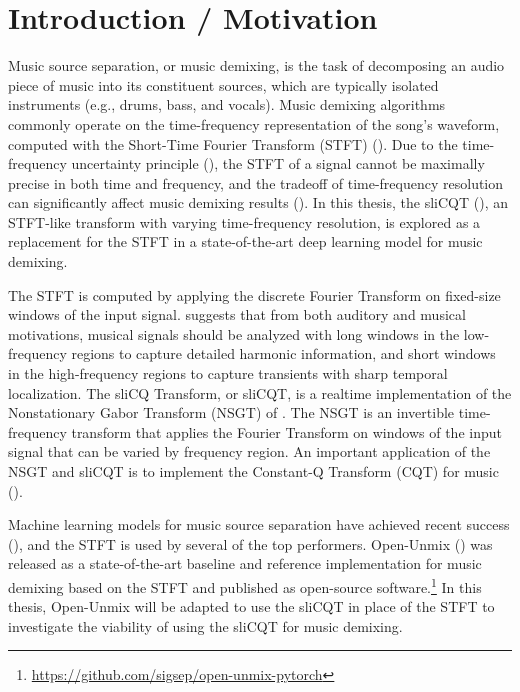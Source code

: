 \documentclass[letter,12pt]{article}
\title{\ThesisTitle}
\author{Sevag Hanssian}
\begin{document}
\maketitle

\section{Introduction / Motivation}

Music source separation, or music demixing, is the task of decomposing an audio piece of music into its constituent sources, which are typically isolated instruments (e.g., drums, bass, and vocals). Music demixing algorithms commonly operate on the time-frequency representation of the song's waveform, computed with the Short-Time Fourier Transform (STFT) (\cite{musicsepgood}). Due to the time-frequency uncertainty principle (\cite{gabor1946}), the STFT of a signal cannot be maximally precise in both time and frequency, and the tradeoff of time-frequency resolution can significantly affect music demixing results (\cite{tftradeoff1}). In this thesis, the sliCQT (\cite{slicq}), an STFT-like transform with varying time-frequency resolution, is explored as a replacement for the STFT in a state-of-the-art deep learning model for music demixing.

The STFT is computed by applying the discrete Fourier Transform on fixed-size windows of the input signal. \textcite{doerflerphd} suggests that from both auditory and musical motivations, musical signals should be analyzed with long windows in the low-frequency regions to capture detailed harmonic information, and short windows in the high-frequency regions to capture transients with sharp temporal localization. The sliCQ Transform, or sliCQT, is a realtime implementation of the Nonstationary Gabor Transform (NSGT) of \textcite{balazs}. The NSGT is an invertible time-frequency transform that applies the Fourier Transform on windows of the input signal that can be varied by frequency region. An important application of the NSGT and sliCQT is to implement the Constant-Q Transform (CQT) for music (\cite{jbrown}).

Machine learning models for music source separation have achieved recent success (\cite{sisec2018}), and the STFT is used by several of the top performers. Open-Unmix (\cite{umx}) was released as a state-of-the-art baseline and reference implementation for music demixing based on the STFT and published as open-source software.\footnote{\url{https://github.com/sigsep/open-unmix-pytorch}} In this thesis, Open-Unmix will be adapted to use the sliCQT in place of the STFT to investigate the viability of using the sliCQT for music demixing.
\end{document}
